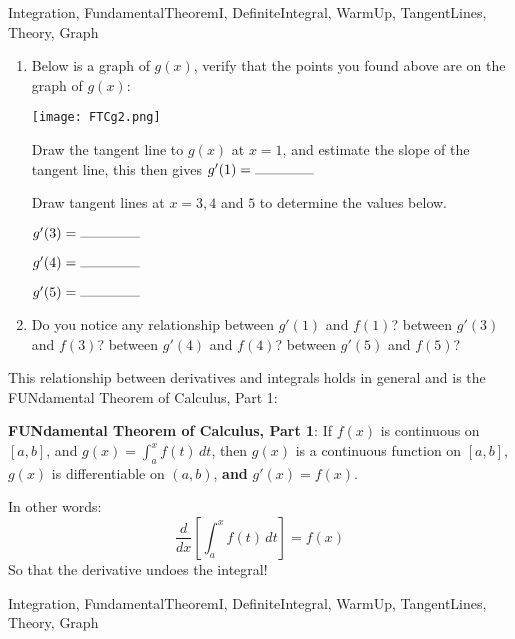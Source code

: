 \begin{tagblock}{Integration, FundamentalTheoremI, DefiniteIntegral, WarmUp, TangentLines, Theory, Graph}
\begin{question}
\begin{enumerate}
\bigskip

\item Below is a graph of $g(x)$, verify that the points you found above are on the graph of $g(x)$:

\begin{minipage}{.4\textwidth}
\texttt{[image: FTCg2.png]}\end{minipage}%
\begin{minipage}{.6\textwidth}

Draw the tangent line to $g(x)$ at $x=1$, and estimate the slope of the tangent line, this then gives   $g'(1) =  \rule{1.5cm}{.1mm}$ \\
\bigskip

Draw tangent lines at $x=3, 4$ and $5$ to determine the values below.  

\bigskip

$g'(3) =  \rule{1.5cm}{.1mm}$ 
\bigskip

$g'(4) =  \rule{1.5cm}{.1mm}$ 

\bigskip

$g'(5) =  \rule{1.5cm}{.1mm}$ 
 \end{minipage}
 
 \bigskip
\item  Do you notice any relationship between $g'(1)$ and $f(1)$?  between $g'(3)$ and $f(3)$? between $g'(4)$ and $f(4)$?  between $g'(5)$ and $f(5)$?
 
\end{enumerate}


\bigskip

This relationship between derivatives and integrals holds in general and is the FUNdamental Theorem of Calculus, Part 1: 

\bigskip

\textbf{FUNdamental Theorem of Calculus, Part 1}:  If $f(x)$ is  continuous on $[a,b]$, and $g(x) =  \int_a^x f(t) \, dt$, then $g(x)$ is a continuous function on $[a,b]$, $g(x)$ is differentiable on $(a,b)$, \textbf{and}  $g'(x) = f(x). $

In other words:
\[ \frac{d}{dx} [ \int_a^x f(t) \, dt ] = f(x) \]
So that the derivative undoes the integral!

	
	
\begin{tags}
	   Integration, FundamentalTheoremI, DefiniteIntegral, WarmUp, TangentLines, Theory, Graph
\end{tags}
	

\end{question}
\end{tagblock}
